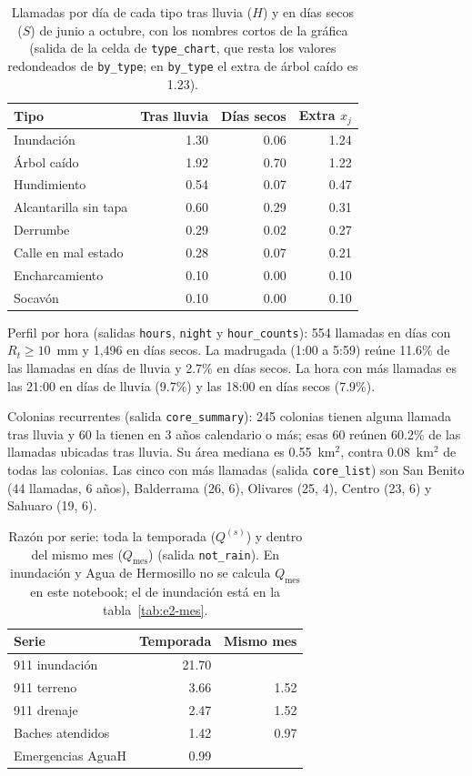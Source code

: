 \documentclass[11pt]{article}
\newcommand{\cod}[1]{\nolinkurl{#1}}
\begin{document}
\begin{table}[!htbp]
  \centering
  \small
  \caption{Llamadas por día de cada tipo tras lluvia ($H$) y en días secos ($S$) de junio a octubre, con los nombres cortos de la gráfica (salida de la celda de \cod{type_chart}, que resta los valores redondeados de \cod{by_type}; en \cod{by_type} el extra de árbol caído es 1.23).}
  \label{tab:n9-tipos}
  \begin{tabular}{lrrr}
    \toprule
    Tipo & Tras lluvia & Días secos & Extra $x_j$ \\
    \midrule
    Inundación & 1.30 & 0.06 & 1.24 \\
    Árbol caído & 1.92 & 0.70 & 1.22 \\
    Hundimiento & 0.54 & 0.07 & 0.47 \\
    Alcantarilla sin tapa & 0.60 & 0.29 & 0.31 \\
    Derrumbe & 0.29 & 0.02 & 0.27 \\
    Calle en mal estado & 0.28 & 0.07 & 0.21 \\
    Encharcamiento & 0.10 & 0.00 & 0.10 \\
    Socavón & 0.10 & 0.00 & 0.10 \\
    \bottomrule
  \end{tabular}
\end{table}

Perfil por hora (salidas \cod{hours}, \cod{night} y \cod{hour_counts}): 554 llamadas en días con $R_t\ge 10$~mm y 1,496 en días secos. La madrugada (1:00 a 5:59) reúne 11.6\% de las llamadas en días de lluvia y 2.7\% en días secos. La hora con más llamadas es las 21:00 en días de lluvia (9.7\%) y las 18:00 en días secos (7.9\%).

Colonias recurrentes (salida \cod{core_summary}): 245 colonias tienen alguna llamada tras lluvia y 60 la tienen en 3 años calendario o más; esas 60 reúnen 60.2\% de las llamadas ubicadas tras lluvia. Su área mediana es 0.55~km$^2$, contra 0.08~km$^2$ de todas las colonias. Las cinco con más llamadas (salida \cod{core_list}) son San Benito (44 llamadas, 6 años), Balderrama (26, 6), Olivares (25, 4), Centro (23, 6) y Sahuaro (19, 6).

\begin{table}[!htbp]
  \centering
  \small
  \caption{Razón por serie: toda la temporada ($Q^{(s)}$) y dentro del mismo mes ($Q_{\text{mes}}$) (salida \cod{not_rain}). En inundación y Agua de Hermosillo no se calcula $Q_{\text{mes}}$ en este notebook; el de inundación está en la tabla~\ref{tab:e2-mes}.}
  \label{tab:n9-nolluvia}
  \begin{tabular}{lrr}
    \toprule
    Serie & Temporada & Mismo mes \\
    \midrule
    911 inundación & 21.70 & \\
    911 terreno & 3.66 & 1.52 \\
    911 drenaje & 2.47 & 1.52 \\
    Baches atendidos & 1.42 & 0.97 \\
    Emergencias AguaH & 0.99 & \\
    \bottomrule
  \end{tabular}
\end{table}
\end{document}
